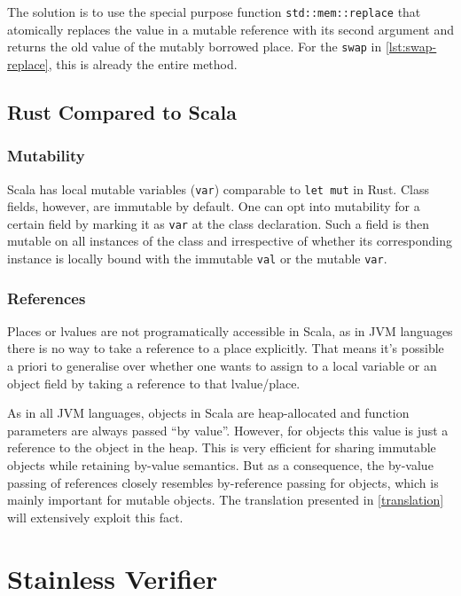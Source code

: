 The solution is to use the special purpose function
\lstinline!std::mem::replace! that atomically replaces the value in a mutable
reference with its second argument and returns the old value of the mutably
borrowed place. For the \lstinline!swap! in \autoref{lst:swap-replace}, this is
already the entire method.


\subsection{Rust Compared to Scala}

\subsubsection{Mutability}

Scala has local mutable variables (\lstinline!var!) comparable to
\passthrough{\lstinline!let mut!} in Rust. Class fields, however, are immutable
by default. One can opt into mutability for a certain field by marking it as
\lstinline!var! at the class declaration. Such a field is then mutable on all
instances of the class and irrespective of whether its corresponding instance is
locally bound with the immutable \lstinline!val! or the mutable \lstinline!var!.

\subsubsection{References}

Places or lvalues are not programatically accessible in Scala, as in JVM
languages there is no way to take a reference to a place explicitly. That means
it's possible a priori to generalise over whether one wants to assign to a local
variable or an object field by taking a reference to that lvalue/place.

As in all JVM languages, objects in Scala are heap-allocated and function
parameters are always passed ``by value''. However, for objects this value is
just a reference to the object in the heap. This is very efficient for sharing
immutable objects while retaining by-value semantics. But as a consequence, the
by-value passing of references closely resembles by-reference passing for
objects, which is mainly important for mutable objects. The translation
presented in \autoref{translation} will extensively exploit this fact.





\section{Stainless Verifier}

